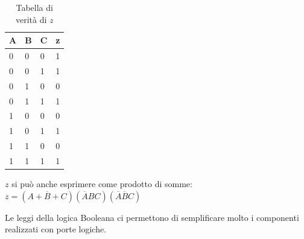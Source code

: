 \begin{table}[H]
	\centering
	\caption{Tabella di verità di $ z $}
	\label{tab:z-truth}
	\begin{tabular}{|l|l|l|l|}
		\hline
		A & B & C & z \\ \hline
		0                       & 0                      & 0 & 1 \\  
		0                       & 0                      & 1 & 1 \\ 
		0                       & 1                      & 0 & 0 \\ 
		0                       & 1                      & 1 & 1 \\ 
		1                       & 0                      & 0 & 0 \\ 
		1                       & 0                      & 1 & 1 \\  
		1                       & 1                      & 0 & 0 \\ 
		1                       & 1                      & 1 & 1 \\ \hline
	\end{tabular}
\end{table}

$ z $ si può anche esprimere come prodotto di somme: $ z = (A+\overbar{B}+C)(\overbar{A}BC)(\overbar{A}\overbar{B}C) $

Le leggi della logica Booleana ci permettono di semplificare molto i componenti realizzati con porte logiche.


